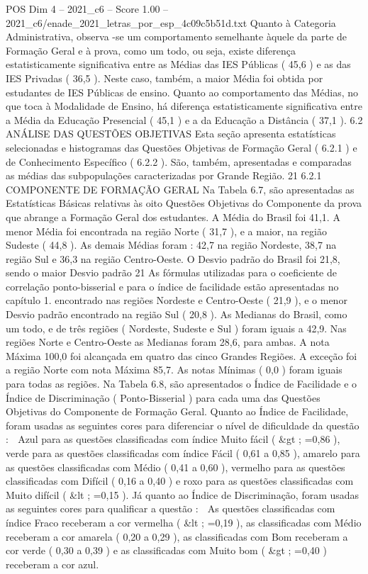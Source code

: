 \begin{textsample}{POS Dim 4 – 2021\_c6 – Score 1.00 – 2021\_c6/enade\_2021\_letras\_por\_esp\_4c09c5b51d.txt}
Quanto à Categoria Administrativa, observa -se um comportamento semelhante àquele da parte de Formação Geral e à prova, como um todo, ou seja, existe diferença estatisticamente significativa entre as Médias das IES Públicas ( 45,6 ) e as das IES Privadas ( 36,5 ).
Neste caso, também, a maior Média foi obtida por estudantes de IES Públicas de ensino.
Quanto ao comportamento das Médias, no que toca à Modalidade de Ensino, há diferença estatisticamente significativa entre a Média da Educação Presencial ( 45,1 ) e a da Educação a Distância ( 37,1 ). 6.2 ANÁLISE DAS QUESTÕES OBJETIVAS Esta seção apresenta estatísticas selecionadas e histogramas das Questões Objetivas de Formação Geral ( 6.2.1 ) e de Conhecimento Específico ( 6.2.2 ).
São, também, apresentadas e comparadas as médias das subpopulações caracterizadas por Grande Região. 21 6.2.1 COMPONENTE DE FORMAÇÃO GERAL Na Tabela 6.7, são apresentadas as Estatísticas Básicas relativas às oito Questões Objetivas do Componente da prova que abrange a Formação Geral dos estudantes.
A Média do Brasil foi 41,1.
A menor Média foi encontrada na região Norte ( 31,7 ), e a maior, na região Sudeste ( 44,8 ).
As demais Médias foram : 42,7 na região Nordeste, 38,7 na região Sul e 36,3 na região Centro-Oeste.
O Desvio padrão do Brasil foi 21,8, sendo o maior Desvio padrão 21 As fórmulas utilizadas para o coeficiente de correlação ponto-bisserial e para o índice de facilidade estão apresentadas no capítulo 1. encontrado nas regiões Nordeste e Centro-Oeste ( 21,9 ), e o menor Desvio padrão encontrado na região Sul ( 20,8 ).
As Medianas do Brasil, como um todo, e de três regiões ( Nordeste, Sudeste e Sul ) foram iguais a 42,9.
Nas regiões Norte e Centro-Oeste as Medianas foram 28,6, para ambas.
A nota Máxima 100,0 foi alcançada em quatro das cinco Grandes Regiões.
A exceção foi a região Norte com nota Máxima 85,7.
As notas Mínimas ( 0,0 ) foram iguais para todas as regiões.
Na Tabela 6.8, são apresentados o Índice de Facilidade e o Índice de Discriminação ( Ponto-Bisserial ) para cada uma das Questões Objetivas do Componente de Formação Geral.
Quanto ao Índice de Facilidade, foram usadas as seguintes cores para diferenciar o nível de dificuldade da questão :  Azul para as questões classificadas com índice Muito fácil ( \&gt ; =0,86 ), verde para as questões classificadas com índice Fácil ( 0,61 a 0,85 ), amarelo para as questões classificadas com Médio ( 0,41 a 0,60 ), vermelho para as questões classificadas com Difícil ( 0,16 a 0,40 ) e roxo para as questões classificadas com Muito difícil ( \&lt ; =0,15 ).
Já quanto ao Índice de Discriminação, foram usadas as seguintes cores para qualificar a questão :  As questões classificadas com índice Fraco receberam a cor vermelha ( \&lt ; =0,19 ), as classificadas com Médio receberam a cor amarela ( 0,20 a 0,29 ), as classificadas com Bom receberam a cor verde ( 0,30 a 0,39 ) e as classificadas com Muito bom ( \&gt ; =0,40 ) receberam a cor azul.

\end{textsample}
